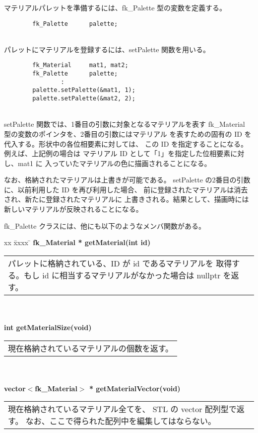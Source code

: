 マテリアルパレットを準備するには、fk\_Palette 型の変数を定義する。
\\
\begin{screen}
\begin{verbatim}
        fk_Palette      palette;
\end{verbatim}
\end{screen}
~ \\
パレットにマテリアルを登録するには、setPalette 関数を用いる。
\\
\begin{screen}
\begin{verbatim}
        fk_Material     mat1, mat2;
        fk_Palette      palette;
                :
        palette.setPalette(&mat1, 1);
        palette.setPalette(&mat2, 2);
\end{verbatim}
\end{screen}
~ \\
setPalette 関数では、1番目の引数に対象となるマテリアルを表す
fk\_Material 型の変数のポインタを、2番目の引数にはマテリアル
を表すための固有の ID を代入する。形状中の各位相要素に対しては、
この ID を指定することになる。例えば、上記例の場合は
マテリアル ID として「1」を指定した位相要素に対し、mat1 に
入っていたマテリアルの色に描画されることになる。

なお、格納されたマテリアルは上書きが可能である。
setPalette の2番目の引数に、以前利用した ID を再び利用した場合、
前に登録されたマテリアルは消去され、新たに登録されたマテリアルに
上書きされる。結果として、描画時には新しいマテリアルが反映されることになる。

fk\_Palette クラスには、他にも以下のようなメンバ関数がある。
\begin{tabbing}
xx \= xxxx \= \kill
\> \textbf{fk\_Material * getMaterial(int id)} \\
	\> \> \begin{tabular}{p{15cm}}
		パレットに格納されている、ID が id であるマテリアルを
		取得する。もし id に相当するマテリアルがなかった場合は
		nullptr を返す。
	\end{tabular} \\ \\

\> \textbf{int getMaterialSize(void)} \\
	\> \> \begin{tabular}{p{15cm}}
		現在格納されているマテリアルの個数を返す。
	\end{tabular} \\ \\

\> \textbf{vector\(<\)fk\_Material\(>\) * getMaterialVector(void)} \\
	\> \> \begin{tabular}{p{15cm}}
		現在格納されているマテリアル全てを、
		STL の vector 配列型で返す。
		なお、ここで得られた配列中を編集してはならない。
	\end{tabular} \\ \\
\end{tabbing}

